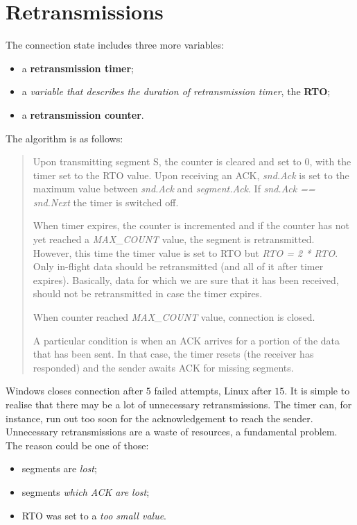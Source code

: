 \documentclass[10pt]{book}
\begin{document}
\section{Retransmissions}

The connection state includes three more variables:

\begin{itemize}
	\item a \textbf{retransmission timer};
	\item a \emph{variable that describes the duration of retransmission
		timer}, the \textbf{RTO};
	\item a \textbf{retransmission counter}.
\end{itemize}

The algorithm is as follows:

\begin{quote}
Upon transmitting segment S, the counter is cleared and set to $0$, with the
timer set to the RTO value. Upon receiving an ACK, \emph{snd.Ack} is set to
the maximum value between \emph{snd.Ack} and \emph{segment.Ack}. If
\emph{snd.Ack == snd.Next} the timer is switched off.

When timer expires, the counter is incremented and if the counter has not yet
reached a \emph{MAX\_COUNT} value, the segment is retransmitted. However, this
time the timer value is set to RTO but \emph{RTO = 2 * RTO}. Only in-flight data
should be retransmitted (and all of it after timer expires). Basically, data
for which we are sure that it has been received, should not be retransmitted in
case the timer expires.

When counter reached \emph{MAX\_COUNT} value, connection is closed.

A particular condition is when an ACK arrives for a portion of the data that
has been sent. In that case, the timer resets (the receiver has responded) and
the sender awaits ACK for missing segments.
\end{quote}

Windows closes connection after $5$ failed attempts, Linux after $15$. It is
simple to realise that there may be a lot of unnecessary retransmissions. The
timer can, for instance, run out too soon for the acknowledgement to reach the
sender. Unnecessary retransmissions are a waste of resources, a fundamental
problem. The reason could be one of those:

\begin{itemize}
    \item segments are \emph{lost};
    \item segments \emph{which ACK are lost};
    \item RTO was set to a \emph{too small value}.
\end{itemize}
\end{document}
